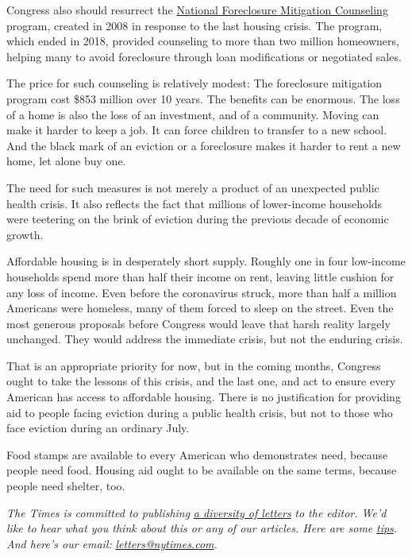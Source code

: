 Congress also should resurrect the
\href{https://neighborworks.org/NFMCCapstoneReport}{National Foreclosure
Mitigation Counseling} program, created in 2008 in response to the last
housing crisis. The program, which ended in 2018, provided counseling to
more than two million homeowners, helping many to avoid foreclosure
through loan modifications or negotiated sales.

The price for such counseling is relatively modest: The foreclosure
mitigation program cost \$853 million over 10 years. The benefits can be
enormous. The loss of a home is also the loss of an investment, and of a
community. Moving can make it harder to keep a job. It can force
children to transfer to a new school. And the black mark of an eviction
or a foreclosure makes it harder to rent a new home, let alone buy one.

The need for such measures is not merely a product of an unexpected
public health crisis. It also reflects the fact that millions of
lower-income households were teetering on the brink of eviction during
the previous decade of economic growth.

Affordable housing is in desperately short supply. Roughly one in four
low-income households spend more than half their income on rent, leaving
little cushion for any loss of income. Even before the coronavirus
struck, more than half a million Americans were homeless, many of them
forced to sleep on the street. Even the most generous proposals before
Congress would leave that harsh reality largely unchanged. They would
address the immediate crisis, but not the enduring crisis.

That is an appropriate priority for now, but in the coming months,
Congress ought to take the lessons of this crisis, and the last one, and
act to ensure every American has access to affordable housing. There is
no justification for providing aid to people facing eviction during a
public health crisis, but not to those who face eviction during an
ordinary July.

Food stamps are available to every American who demonstrates need,
because people need food. Housing aid ought to be available on the same
terms, because people need shelter, too.

\emph{The Times is committed to publishing}
\href{https://www.nytimes.com/2019/01/31/opinion/letters/letters-to-editor-new-york-times-women.html}{\emph{a
diversity of letters}} \emph{to the editor. We'd like to hear what you
think about this or any of our articles. Here are some}
\href{https://help.nytimes.com/hc/en-us/articles/115014925288-How-to-submit-a-letter-to-the-editor}{\emph{tips}}\emph{.
And here's our email:}
\href{mailto:letters@nytimes.com}{\emph{letters@nytimes.com}}\emph{.}

